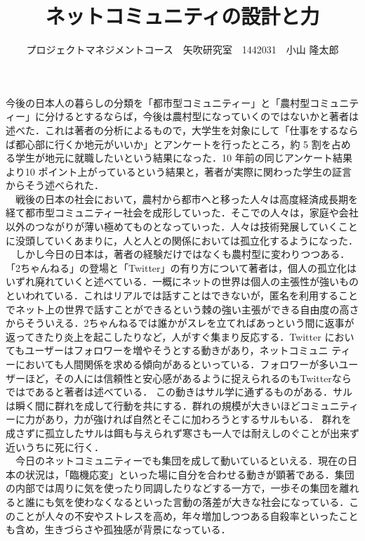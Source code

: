 \documentclass[uplatex,twocolumn,dvipdfmx]{jsarticle}
\title{\vspace{-5mm}\fontsize{14pt}{0pt}\selectfont ネットコミュニティの設計と力}
\author{\normalsize プロジェクトマネジメントコース　矢吹研究室　1442031　小山 隆太郎}
\date{}
\begin{document}
\fontsize{10.5pt}{\baselineskip}\selectfont
\maketitle






今後の日本人の暮らしの分類を「都市型コミュニティー」と「農村型コミュニティー」に分けるとするならば，今後は農村型になっていくのではないかと著者は述べた．これは著者の分析によるもので，大学生を対象にして「仕事をするならば都心部に行くか地元がいいか」とアンケートを行ったところ，約 5 割を占める学生が地元に就職したいという結果になった．10 年前の同じアンケート結果より10 ポイント上がっているという結果と，著者が実際に関わった学生の証言からそう述べられた．\\
　戦後の日本の社会において，農村から都市へと移った人々は高度経済成長期を経て都市型コミュニティー社会を成形していった．そこでの人々は，家庭や会社以外のつながりが薄い極めてものとなっていった．人々は技術発展していくことに没頭していくあまりに，人と人との関係においては孤立化するようになった．\\
　しかし今日の日本は，著者の経験だけではなくも農村型に変わりつつある．「2ちゃんねる」の登場と「Twitter」の有り方について著者は，個人の孤立化はいずれ廃れていくと述べている．一概にネットの世界は個人の主張性が強いものといわれている．これはリアルでは話すことはできないが，匿名を利用することでネット上の世界で話すことができるという棘の強い主張ができる自由度の高さからそういえる．2ちゃんねるでは誰かがスレを立てればあっという間に返事が返ってきたり炎上を起こしたりなど，人がすぐ集まり反応する．Twitter においてもユーザーはフォロワーを増やそうとする動きがあり，ネットコミュニ ティーにおいても人間関係を求める傾向があるといっている．フォロワーが多いユーザーほど，その人には信頼性と安心感があるように捉えられるのもTwitterならではであると著者は述べている．
この動きはサル学に通ずるものがある．サルは瞬く間に群れを成して行動を共にする．群れの規模が大きいほどコミュニティーに力があり，力が強ければ自然とそこに加わろうとするサルもいる． 群れを成さずに孤立したサルは餌も与えられず寒さも一人では耐えしのぐことが出来ず近いうちに死に行く．\\
　今日のネットコミュニティーでも集団を成して動いているといえる．現在の日本の状況は，「臨機応変」といった場に自分を合わせる動きが顕著である．集団の内部では周りに気を使ったり同調したりなどする一方で，一歩その集団を離れると誰にも気を使わなくなるといった言動の落差が大きな社会になっている．このことが人々の不安やストレスを高め，年々増加しつつある自殺率といったことも含め，生きづらさや孤独感が背景になっている．\\　　　　　　　　
\end{document}
